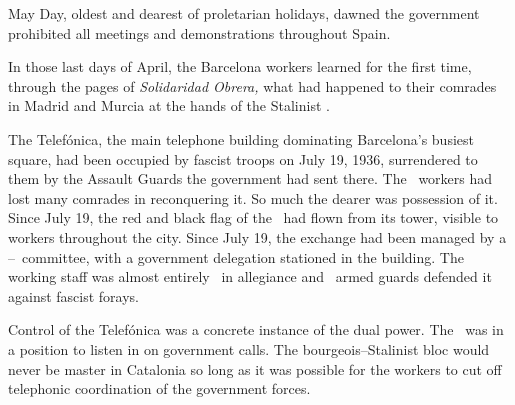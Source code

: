 May Day, oldest and dearest of proletarian holidays, dawned the government prohibited all meetings and demonstrations throughout Spain.

In those last days of April, the Barcelona workers learned for the first time, through the pages of \emph{Solidaridad Obrera,} what had happened to their comrades in Madrid and Murcia at the hands of the Stalinist \GPU\kn.

\dinkus

The Telef\'onica, the main telephone building dominating Bar\-ce\-lo\-na’s busiest square, had been occupied by fascist troops on July 19, 1936, surrendered to them by the Assault Guards the government had sent there. The \CNT\ workers had lost many comrades in reconquering it. So much the dearer was possession of it. Since July 19, the red and black flag of the \CNT\ had flown from its tower, visible to workers throughout the city. Since July 19, the exchange had been managed by a \CNT--\UGT\ committee, with a government delegation stationed in the building. The working staff was almost entirely \CNT\ in allegiance and \CNT\ armed guards defended it against fascist forays.

Control of the Telef\'onica was a concrete instance of the dual power. The \CNT\ was in a position to listen in on government calls. The bourgeois--Stalinist bloc would never be master in Catalonia so long as it was possible for the workers to cut off telephonic coordination of the government forces.

